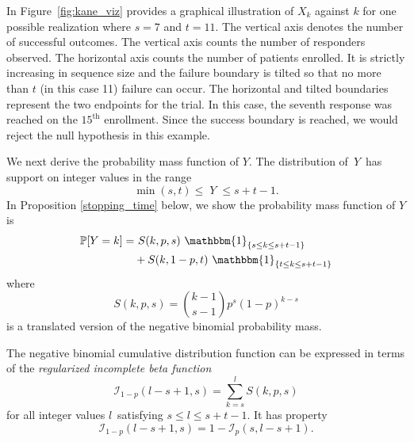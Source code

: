 \documentclass[sii]{ipart}
\begin{document}
In Figure~\ref{fig:kane_viz} provides a graphical illustration of $X_k$ against
$k$ for one possible realization where $s=7$ and $t=11$. The vertical axis denotes the number of
successful outcomes. The vertical axis counts the number of responders observed.
The horizontal axis counts the number of patients 
enrolled. It is strictly increasing in sequence size and the failure boundary is tilted so that no more than $t$ (in this case 11) failure can occur. The horizontal and tilted boundaries represent the two
endpoints for the trial. In this case, the seventh response was reached on
the $15^{\text{th}}$ enrollment.
Since the success boundary is reached, we would reject the null hypothesis in this example.

We next derive the probability mass function of $Y$. The distribution of $\,Y\,$ has support on integer values in the range
\begin{equation*}               
     \min(s,t) \leq \; Y \;\leq s+t-1  \label{range.y.eq}.
\end{equation*}
In Proposition \ref{stopping_time} below, we show the probability mass function of $Y$ is
\begin{align} \label{eqn:pmf}
\mathbb{P} [Y=k] =& \ S(k, p, s) \ \mathbbm{1}_{\{s \leq k \leq s+t-1\}} \nonumber \\
  & + S(k, 1-p, t) \ \mathbbm{1}_{\{ t \leq k \leq s+t-1 \}}
\end{align}
where
\begin{equation} \label{eqn:N}
S(k, p, s) = {k-1 \choose s-1} p^s (1-p)^{k-s} 
\end{equation}
is a translated version of the negative binomial probability mass.

The negative binomial cumulative distribution function can be expressed in terms of the
{\em regularized incomplete beta function} \citep{Olver2010} 
\begin{equation*}
\mathcal{I}_{1-p}(l - s + 1, s) = \sum_{k=s}^l S(k, p, s) 
\end{equation*}
for all integer values $l\,$ satisfying $s \leq l \leq s+t-1$. It has property \citep{Uppuluri1967}
\begin{equation} \label{ribf}
\mathcal{I}_{1-p}(l-s+1, s) = 1 - \mathcal{I}_p(s, l-s+1).
\end{equation}
\end{document}
